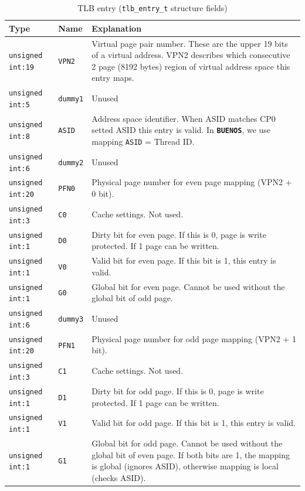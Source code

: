 \documentclass[twoside,a4paper]{report}
\newcommand{\PBS}[1]{\let\temp=\\#1\let\\=\temp}
\newlength{\tablewidth}
\newenvironment{structdescription}{%
\begin{center}%
\begin{tabular}{p{3.5cm}|p{2.5cm}|>{\PBS\raggedright}p{\tablewidth-6\tabcolsep-6cm}}%
\textbf{Type} & \textbf{Name} & \textbf{Explanation} \\ %
}{%
\end{tabular}%
\end{center}%
}
\newcommand{\structfield}[3]{%
\hline%
\texttt{#1} & \texttt{#2} & #3 \\%
}
\newcommand{\buenos}{\texttt{\textbf{BUENOS}}}
\begin{document}
\begin{table}
\begin{structdescription}

\structfield{unsigned int:19}{VPN2}{Virtual page pair number. These
are the upper 19 bits of a virtual address. VPN2 describes which
consecutive 2 page (8192 bytes) region of virtual address space this
entry maps.}

\structfield{unsigned int:5}{dummy1}{Unused}

\structfield{unsigned int:8}{ASID}{Address space identifier. When ASID
matches CP0 setted ASID this entry is valid. In \buenos{}, we use mapping
\texttt{ASID} = Thread ID.}

\structfield{unsigned int:6}{dummy2}{Unused}

\structfield{unsigned int:20}{PFN0}{Physical page number for even page
mapping (VPN2 + 0 bit).}

\structfield{unsigned int:3}{C0}{Cache settings. Not used.}

\structfield{unsigned int:1}{D0}{Dirty bit for even page. If this is
0, page is write protected. If 1 page can be written.}

\structfield{unsigned int:1}{V0}{Valid bit for even page. If this bit
is 1, this entry is valid.}

\structfield{unsigned int:1}{G0}{Global bit for even page. Cannot be
used without the global bit of odd page.}

\structfield{unsigned int:6}{dummy3}{Unused}

\structfield{unsigned int:20}{PFN1}{Physical page number for odd page
mapping (VPN2 + 1 bit).}

\structfield{unsigned int:3}{C1}{Cache settings. Not used.}

\structfield{unsigned int:1}{D1}{Dirty bit for odd page. If this is
0, page is write protected. If 1 page can be written.}

\structfield{unsigned int:1}{V1}{Valid bit for odd page. If this bit
is 1, this entry is valid.}

\structfield{unsigned int:1}{G1}{Global bit for odd page. Cannot be
used without the global bit of even page. If both bits are 1, the
mapping is global (ignores ASID), otherwise mapping is local (checks
ASID).}

\end{structdescription}

\caption{TLB entry (\texttt{tlb\_entry\_t} structure fields)}
\label{tab:tlbentry}
\end{table}
\end{document}
